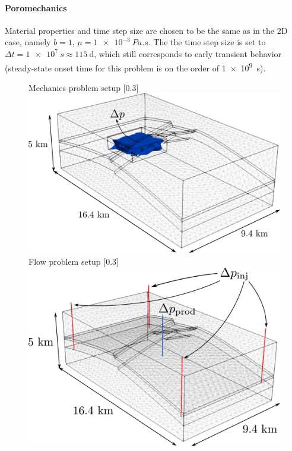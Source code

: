 \paragraph{Poromechanics}
Material properties and time step size are chosen to be the same as in the 2D case, namely $b = 1$, $\mu = \qty{1e-3}{Pa.s}$.   The the time step size is set to $\Delta t = \qty{1e7}{s} \approx \qty{115}{\day}$, which still corresponds to early transient behavior (steady-state onset time for this problem is on the order of \qty{1e9}{s}).

\begin{figure} [htbp]
    \subcaptionbox
    {
        Mechanics problem setup
        \label{fig:mazumodel2_matlab_setup_mech_sketch}
    }
    [0.3\textwidth]
    {
        \includegraphics[width=\linewidth]{figs/MazuModel2/matlab/mech_sketch}
    }
    \hfill
    \subcaptionbox
    {
        Flow problem setup
        \label{fig:mazumodel2_matlab_setup_flow_sketch}
    }
    [0.3\textwidth]
    {
        \includegraphics[width=\linewidth]{figs/MazuModel2/matlab/flow_sketch}
}
\end{figure}
